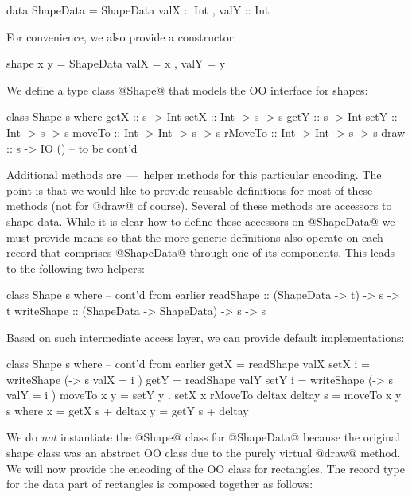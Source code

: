\documentclass{jfp}
\begin{document}
\begin{code}
 data ShapeData =
      ShapeData { valX :: Int
                , valY :: Int }
\end{code}

For convenience, we also provide a constructor:

\begin{code}
 shape x y = ShapeData { valX = x
                       , valY = y }
\end{code}

We define a type class @Shape@ that models the OO interface for shapes:

\begin{code}
 class Shape s
  where
   getX       :: s -> Int
   setX       :: Int -> s -> s
   getY       :: s -> Int
   setY       :: Int -> s -> s
   moveTo     :: Int -> Int -> s -> s
   rMoveTo    :: Int -> Int -> s -> s
   draw       :: s -> IO ()
   -- to be cont'd
\end{code}

Additional methods are~---~helper methods for this particular
encoding. The point is that we would like to provide reusable
definitions for most of these methods (not for @draw@ of
course). Several of these methods are accessors to shape data. While
it is clear how to define these accessors on @ShapeData@ we must
provide means so that the more generic definitions also operate on
each record that comprises @ShapeData@ through one of its
components. This leads to the following two helpers:

\begin{code}
 class Shape s
  where
   -- cont'd from earlier
   readShape  :: (ShapeData -> t)         -> s -> t
   writeShape :: (ShapeData -> ShapeData) -> s -> s
\end{code}

Based on such intermediate access layer, we can provide default
implementations:

\begin{code}
 class Shape s
  where
   -- cont'd from earlier
   getX       =  readShape valX
   setX i     =  writeShape (\s -> s  { valX = i })
   getY       =  readShape valY
   setY i     =  writeShape (\s -> s  { valY = i })
   moveTo x y =  setY y . setX x 
   rMoveTo deltax deltay s = moveTo x y s
    where
      x = getX s + deltax
      y = getY s + deltay
\end{code}

We do \emph{not} instantiate the @Shape@ class for @ShapeData@ because
the original shape class was an abstract OO class due to the purely
virtual @draw@ method. We will now provide the encoding of the OO
class for rectangles. The record type for the data part of rectangles
is composed together as follows:
\end{document}
